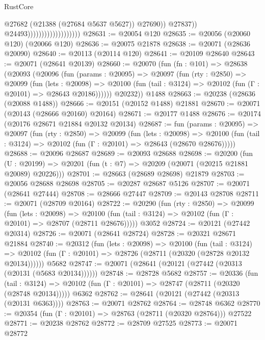 \begin{lexlean}{RustCore}
\begin{coremodule}
                                                  @27682
                                                  (@21388 (@27684 @5637 @5627))
                                                  @27690))
                                              @27837))
                                          @24493)))))))))))))))))))
@28631 := @20054 @120
@28635 := @20056 (@20060 @120) (@20066 @120)
@28636 := @20075 @21878
@28638 := @20071 (@28636 @20090)
@28640 := @20113 (@20114 @120)
@28641 := @20109 @28640
@28643 := @20071 (@28641 @20139)
@28660 := @20070
    (fun (fn : @101) =>
    @28638
      (@20093
        (@20096
          (fun (params : @20095) =>
          @20097
            (fun (rty : @2850) =>
            @20099
              (fun (lets : @20098) =>
              @20100 (fun (tail : @3124) => @20102 (fun (Γ : @20101) => @28643 @20186))))))
        @20232))
    @1488
@28663 := @20238 (@28636 (@20088 @1488))
@28666 := @20151 (@20152 @1488) @21881
@28670 := @20071 (@20143 (@28666 @20160) @20164)
@28671 := @20177 @1488
@28676 := @20174 (@20176 @28671 @21884 @20132 @20134)
@28687 := fun (params : @20095) =>
  @20097
    (fun (rty : @2850) =>
    @20099
      (fun (lets : @20098) =>
      @20100 (fun (tail : @3124) => @20102 (fun (Γ : @20101) => @28643 (@28670 @28676)))))
@28688 := @20096 @28687
@28689 := @20093 @28688
@28698 := @20200
    (fun (U : @20199) => @20201 (fun (t : @7) => @20209 (@20071 (@20215 @21881 @20089) @20226)))
@28701 := @28663 (@28689 @28698) @21879
@28703 := @20056 @28688 @28698
@28705 := @20287 @28687 @5126
@28707 := @20071 (@28641 @27444)
@28708 := @28666 @27447
@28709 := @20143 @28708
@28711 := @20071 (@28709 @20164)
@28722 := @20290
    (fun (rty : @2850) =>
    @20099
      (fun (lets : @20098) =>
      @20100 (fun (tail : @3124) => @20102 (fun (Γ : @20101) => @28707 (@28711 @28676)))))
    @3052
@28724 := @20121 (@27442 @20314)
@28726 := @20071 (@28641 @28724)
@28728 := @20321 @28671 @21884
@28740 := @20312
    (fun (lets : @20098) =>
    @20100
      (fun (tail : @3124) =>
      @20102 (fun (Γ : @20101) => @28726 (@28711 (@20320 (@28728 @20132 @20134))))))
    @5682
@28747 := @20071 (@28641 (@20121 (@27442 (@20313 (@20131 (@5683 @20134))))))
@28748 := @28728 @5682
@28757 := @20336
    (fun (tail : @3124) => @20102 (fun (Γ : @20101) => @28747 (@28711 (@20320 (@28748 @20134)))))
    @6362
@28762 := @28641 (@20121 (@27442 (@20313 (@20131 @6363))))
@28763 := @20071 @28762
@28764 := @28748 @6362
@28770 := @20354 (fun (Γ : @20101) => @28763 (@28711 (@20320 @28764))) @27522
@28771 := @20238 @28762
@28772 := @28709 @27525
@28773 := @20071 @28772

\end{coremodule}
\end{lexlean}
